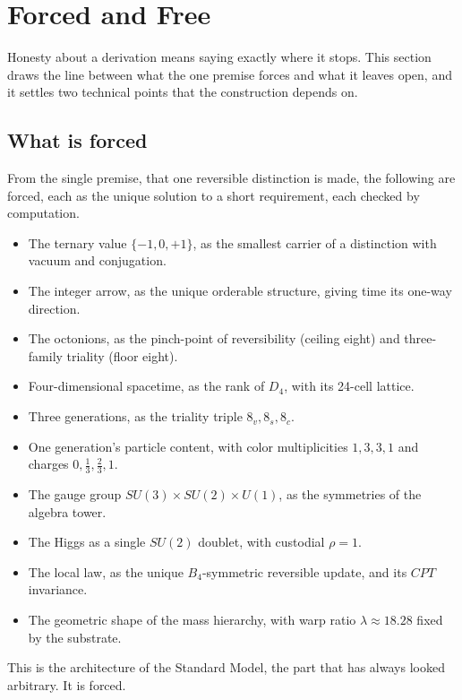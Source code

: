 \section{Forced and Free} \label{sec:forcedfree}

Honesty about a derivation means saying exactly where it stops. This section draws the line between what the one
premise forces and what it leaves open, and it settles two technical points that the construction depends on.

\subsection{What is forced}

From the single premise, that one reversible distinction is made, the following are forced, each as the unique solution
to a short requirement, each checked by computation.

\begin{itemize}
  \item The ternary value $\{-1, 0, +1\}$, as the smallest carrier of a distinction with vacuum and conjugation.
  \item The integer arrow, as the unique orderable structure, giving time its one-way direction.
  \item The octonions, as the pinch-point of reversibility (ceiling eight) and three-family triality (floor eight).
  \item Four-dimensional spacetime, as the rank of $D_4$, with its 24-cell lattice.
  \item Three generations, as the triality triple $8_v, 8_s, 8_c$.
  \item One generation's particle content, with color multiplicities $1, 3, 3, 1$ and charges $0, \tfrac13, \tfrac23, 1$.
  \item The gauge group $SU(3) \times SU(2) \times U(1)$, as the symmetries of the algebra tower.
  \item The Higgs as a single $SU(2)$ doublet, with custodial $\rho = 1$.
  \item The local law, as the unique $B_4$-symmetric reversible update, and its $CPT$ invariance.
  \item The geometric shape of the mass hierarchy, with warp ratio $\lambda \approx 18.28$ fixed by the substrate.
\end{itemize}

This is the architecture of the Standard Model, the part that has always looked arbitrary. It is forced.

